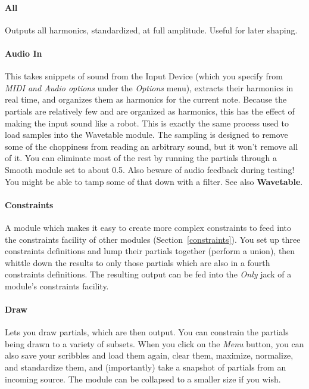\documentclass{article}
\begin{document}
\paragraph{All}  Outputs all harmonics, standardized, at full amplitude.  Useful for later shaping.

\paragraph{Audio In}  This takes snippets of sound from the Input Device (which you specify from {\it MIDI and Audio options} under the {\it Options} menu), extracts their harmonics in real time, and organizes them as harmonics for the current note. Because the partials are relatively few and are organized as harmonics, this has the effect of making the input sound like a robot.  This is exactly the same process used to load samples into the Wavetable module.  The sampling is designed to remove some of the choppiness from reading an arbitrary sound, but it won't remove all of it.  You can eliminate most of the rest by running the partials through a Smooth module set to about 0.5.  Also beware of audio feedback during testing!  You might be able to tamp some of that down with a filter. See also {\bf Wavetable}.


\paragraph{Constraints}   A module which makes it easy to create more complex constraints to feed into the constraints facility of other modules (Section~\ref{constraints}). You set up three constraints definitions and lump their partials together (perform a union), then whittle down the results to only those partials which are also in a fourth constraints definitions.  The resulting output can be fed into the {\it Only} jack of a module's constraints facility.

\paragraph{Draw}   Lets you draw partials, which are then output.   You can constrain the partials being drawn to a variety of subsets.  When you click on the {\it Menu} button, you can also save your scribbles and load them again, clear them, maximize, normalize, and standardize them, and (importantly) take a snapshot of partials from an incoming source.  The module can be collapsed to a smaller size if you wish.
\end{document}
